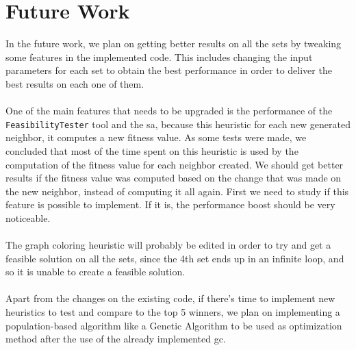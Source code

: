\chapter{Future Work}
\label{chapter:FutureWork}

In the future work, we plan on getting better results on all the sets by tweaking some features in the implemented code. This includes changing the input parameters for each set to obtain the best performance in order to deliver the best results on each one of them.\\
\\
One of the main features that needs to be upgraded is the performance of the \verb+FeasibilityTester+ tool and the \gls{sa}, because this heuristic for each new generated neighbor, it computes a new fitness value. As some tests were made, we concluded that most of the time spent on this heuristic is used by the computation of the fitness value for each neighbor created. We should get better results if the fitness value was computed based on the change that was made on the new neighbor, instead of computing it all again. First we need to study if this feature is possible to implement. If it is, the performance boost should be very noticeable.\\
\\
The graph coloring heuristic will probably be edited in order to try and get a feasible solution on all the sets, since the 4th set ends up in an infinite loop, and so it is unable to create a feasible solution.\\
\\
Apart from the changes on the existing code, if there's time to implement new heuristics to test and compare to the top 5 winners, we plan on implementing a population-based algorithm like a Genetic Algorithm to be used as optimization method after the use of the already implemented \gls{gc}.